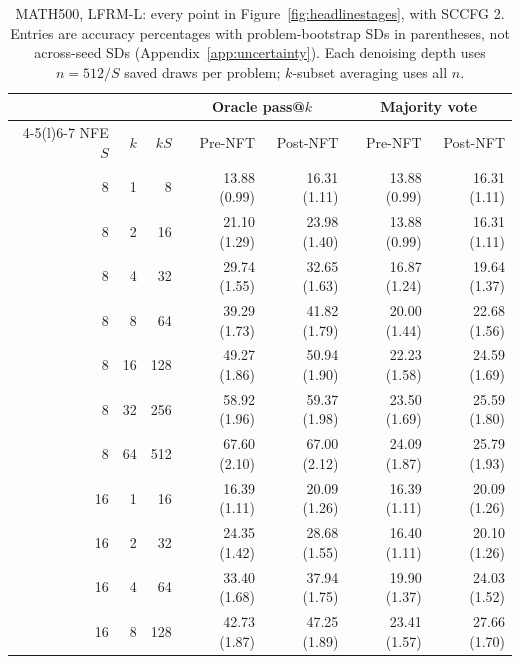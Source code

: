 \documentclass{article}
\begin{document}
\begin{table}[!htbp]
\caption{MATH500, LFRM-L: every point in Figure~\ref{fig:headlinestages}, with SCCFG 2. Entries are accuracy percentages with problem-bootstrap SDs in parentheses, not across-seed SDs (Appendix~\ref{app:uncertainty}). Each denoising depth uses $n=512/S$ saved draws per problem; $k$-subset averaging uses all $n$.}
\label{tab:budgetvaluesmathl}
\centering\small
\setlength{\tabcolsep}{5pt}
\begin{tabular}{@{}rrr rrrr@{}}
\toprule
& & & \multicolumn{2}{c}{Oracle pass@$k$} & \multicolumn{2}{c}{Majority vote} \\
\cmidrule(lr){4-5}\cmidrule(l){6-7}
NFE $S$ & $k$ & $kS$ & Pre-NFT & Post-NFT & Pre-NFT & Post-NFT \\
\midrule
8 & 1 & 8 & 13.88 {\scriptsize (0.99)} & 16.31 {\scriptsize (1.11)} & 13.88 {\scriptsize (0.99)} & 16.31 {\scriptsize (1.11)} \\
8 & 2 & 16 & 21.10 {\scriptsize (1.29)} & 23.98 {\scriptsize (1.40)} & 13.88 {\scriptsize (0.99)} & 16.31 {\scriptsize (1.11)} \\
8 & 4 & 32 & 29.74 {\scriptsize (1.55)} & 32.65 {\scriptsize (1.63)} & 16.87 {\scriptsize (1.24)} & 19.64 {\scriptsize (1.37)} \\
8 & 8 & 64 & 39.29 {\scriptsize (1.73)} & 41.82 {\scriptsize (1.79)} & 20.00 {\scriptsize (1.44)} & 22.68 {\scriptsize (1.56)} \\
8 & 16 & 128 & 49.27 {\scriptsize (1.86)} & 50.94 {\scriptsize (1.90)} & 22.23 {\scriptsize (1.58)} & 24.59 {\scriptsize (1.69)} \\
8 & 32 & 256 & 58.92 {\scriptsize (1.96)} & 59.37 {\scriptsize (1.98)} & 23.50 {\scriptsize (1.69)} & 25.59 {\scriptsize (1.80)} \\
8 & 64 & 512 & 67.60 {\scriptsize (2.10)} & 67.00 {\scriptsize (2.12)} & 24.09 {\scriptsize (1.87)} & 25.79 {\scriptsize (1.93)} \\
\midrule
16 & 1 & 16 & 16.39 {\scriptsize (1.11)} & 20.09 {\scriptsize (1.26)} & 16.39 {\scriptsize (1.11)} & 20.09 {\scriptsize (1.26)} \\
16 & 2 & 32 & 24.35 {\scriptsize (1.42)} & 28.68 {\scriptsize (1.55)} & 16.40 {\scriptsize (1.11)} & 20.10 {\scriptsize (1.26)} \\
16 & 4 & 64 & 33.40 {\scriptsize (1.68)} & 37.94 {\scriptsize (1.75)} & 19.90 {\scriptsize (1.37)} & 24.03 {\scriptsize (1.52)} \\
16 & 8 & 128 & 42.73 {\scriptsize (1.87)} & 47.25 {\scriptsize (1.89)} & 23.41 {\scriptsize (1.57)} & 27.66 {\scriptsize (1.70)} \\

\end{tabular}
\end{table}
\end{document}
